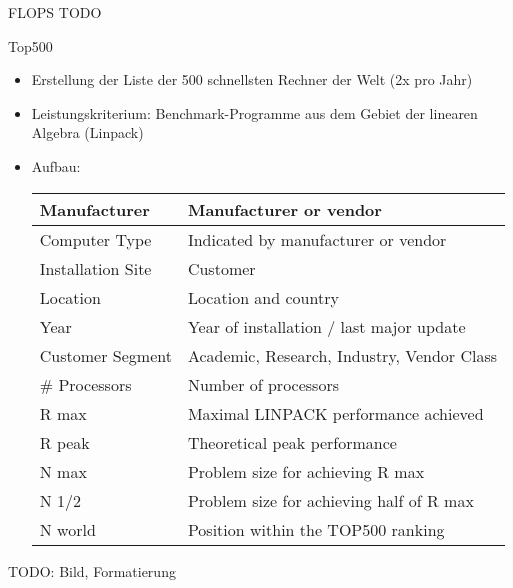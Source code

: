 \begin{example}[Leistungsmaß]{FLOPS}
    TODO
\end{example}

\begin{bonus}{Top500}
    \begin{itemize}
        \item Erstellung der Liste der 500 schnellsten Rechner der Welt (2x pro Jahr)
        \item Leistungskriterium: Benchmark-Programme aus dem Gebiet der linearen Algebra (Linpack)
        \item Aufbau:
              \begin{tabular}{|l|l|}
                  \hline
                  Manufacturer      & Manufacturer or vendor                     \\
                  \hline
                  Computer Type     & Indicated by manufacturer or vendor        \\
                  \hline
                  Installation Site & Customer                                   \\
                  \hline
                  Location          & Location and country                       \\
                  \hline
                  Year              & Year of installation / last major update   \\
                  \hline
                  Customer Segment  & Academic, Research, Industry, Vendor Class \\
                  \hline
                  \# Processors     & Number of processors                       \\
                  \hline
                  R max             & Maximal LINPACK performance achieved       \\
                  \hline
                  R peak            & Theoretical peak performance               \\
                  \hline
                  N max             & Problem size for achieving R max           \\
                  \hline
                  N 1/2             & Problem size for achieving half of R max   \\
                  \hline
                  N world           & Position within the TOP500 ranking         \\
                  \hline
              \end{tabular}
    \end{itemize}
    TODO: Bild, Formatierung
\end{bonus}

